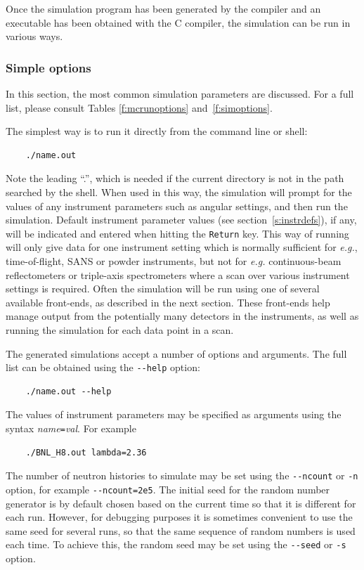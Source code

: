 Once the simulation program has been generated by the \MCS compiler \mcs
and an executable has been obtained with the C compiler, the simulation
can be run in various ways.

\subsubsection{Simple \MCS options}
In this section, the most common simulation parameters are
discussed. For a full list, please consult Tables
\ref{f:mcrunoptions} and~\ref{f:simoptions}.

The simplest way is to run it directly from the
command line or shell:
\begin{lstlisting}
    ./name.out
\end{lstlisting}
Note the leading ``.'', which is needed if the current directory is not in the
path searched by the shell. When used in this way, the simulation will prompt
for the values of any instrument parameters such as angular settings, and then
run the simulation. Default instrument parameter values (see
section~\ref{s:instrdefs}), if any, will be indicated and entered when hitting
the \verb+Return+ key. This way of
running \MCS will only give data for one instrument setting which is normally
sufficient for {\em e.g.}, time-of-flight, SANS or powder instruments, but not
for {\em e.g.} continuous-beam reflectometers or triple-axis spectrometers where
a scan over various instrument settings is required.  Often the simulation will
be run using one of several available front-ends, as described in the next
section. These front-ends help manage output from the potentially many detectors
in the instruments, as well as running the simulation for each data point in a
scan.

The generated simulations accept a number of options and arguments. The
full list can be obtained using the \verb+--help+ option:
\begin{lstlisting}
    ./name.out --help
\end{lstlisting}
The values of instrument parameters may be specified as arguments using
the syntax \textit{name}\verb+=+\textit{val}. For example
\begin{lstlisting}
    ./BNL_H8.out lambda=2.36
\end{lstlisting}
The number of neutron histories to simulate may be set using the
\verb+--ncount+ or \verb+-n+ option, for example
\verb+--ncount=2e5+. The initial seed for the random number generator is
by default chosen based on the current time so that it is different for
each run. However, for debugging purposes it is sometimes convenient to
use the same seed for several runs, so that the same sequence of random
numbers is used each time. To achieve this, the random seed may be set
using the \verb+--seed+ or \verb+-s+ option.

